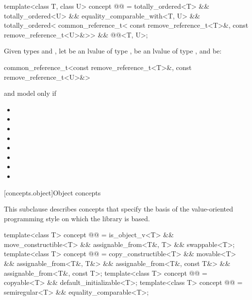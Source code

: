 \begin{itemdecl}
template<class T, class U>
  concept @@ =
    totally_ordered<T> && totally_ordered<U> &&
    equality_comparable_with<T, U> &&
    totally_ordered<
      common_reference_t<
        const remove_reference_t<T>&,
        const remove_reference_t<U>&>> &&
    @@<T, U>;
\end{itemdecl}

\begin{itemdescr}
\pnum
Given types  and ,
let  be an lvalue of type ,
 be an lvalue of type ,
and  be:
\begin{codeblock}
common_reference_t<const remove_reference_t<T>&, const remove_reference_t<U>&>
\end{codeblock}
 and  model
 only if

\begin{itemize}
\item {}
\item {}
\item {}
\item {}
\item {}
\item {}
\item {}
\item {}
\end{itemize}
\end{itemdescr}

[concepts.object]{Object concepts}

\pnum
This subclause describes concepts that specify the basis of the
value-oriented programming style on which the library is based.

\begin{itemdecl}
template<class T>
  concept @@ = is_object_v<T> && move_constructible<T> &&
                    assignable_from<T&, T> && swappable<T>;
template<class T>
  concept @@ = copy_constructible<T> && movable<T> && assignable_from<T&, T&> &&
                     assignable_from<T&, const T&> && assignable_from<T&, const T>;
template<class T>
  concept @@ = copyable<T> && default_initializable<T>;
template<class T>
  concept @@ = semiregular<T> && equality_comparable<T>;
\end{itemdecl}


